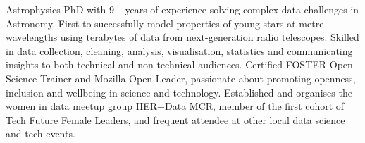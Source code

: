  \vspace{-6pt}

\begin{cvpubs}
  \cvpub
    {
      \begin{cvlist}
  \item {Astrophysics PhD with 9+ years of experience solving complex data challenges in Astronomy. First to successfully model properties of young stars at metre wavelengths using terabytes of data from next-generation radio telescopes. Skilled in data collection, cleaning, analysis, visualisation, statistics and communicating insights to both technical and non-technical audiences. Certified FOSTER Open Science Trainer and Mozilla Open Leader, passionate about promoting openness, inclusion and wellbeing in science and technology. Established and organises the women in data meetup group HER+Data MCR, member of the first cohort of Tech Future Female Leaders, and frequent attendee at other local data science and tech events.}
      \end{cvlist}
    }
\end{cvpubs}

